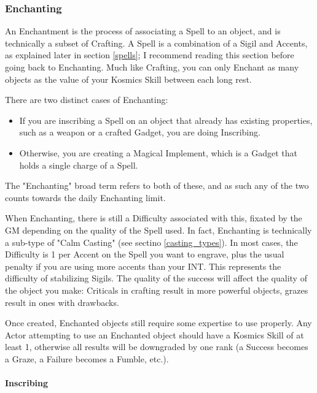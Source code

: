 \subsubsection{Enchanting}



\label{enchanting}

An Enchantment is the process of associating a Spell to an object, and is technically a subset of Crafting. A Spell is a combination of a Sigil and Accents, as explained later in section \ref{spells}; I recommend reading this section before going back to Enchanting. Much like Crafting, you can only Enchant as many objects as the value of your Kosmics Skill between each long rest.

There are two distinct cases of Enchanting:
\begin{itemize}
	\item If you are inscribing a Spell on an object that already has existing properties, such as a weapon or a crafted Gadget, you are doing Inscribing.
	\item Otherwise, you are creating a Magical Implement, which is a Gadget that holds a single charge of a Spell.
\end{itemize}
The "Enchanting" broad term refers to both of these, and as such any of the two counts towards the daily Enchanting limit.

When Enchanting, there is still a Difficulty associated with this, fixated by the GM depending on the quality of the Spell used. In fact, Enchanting is technically a sub-type of "Calm Casting" (see sectino \ref{casting_types}). In most cases, the Difficulty is 1 per Accent on the Spell you want to engrave, plus the usual penalty if you are using more accents than your INT. This represents the difficulty of stabilizing Sigils. The quality of the success will affect the quality of the object you make: Criticals in crafting result in more powerful objects, grazes result in ones with drawbacks.
	
Once created, Enchanted objects still require some expertise to use properly. Any Actor attempting to use an Enchanted object should have a Kosmics Skill of at least 1, otherwise all results will be downgraded by one rank (a Success becomes a Graze, a Failure becomes a Fumble, etc.).


\paragraph{Inscribing}

